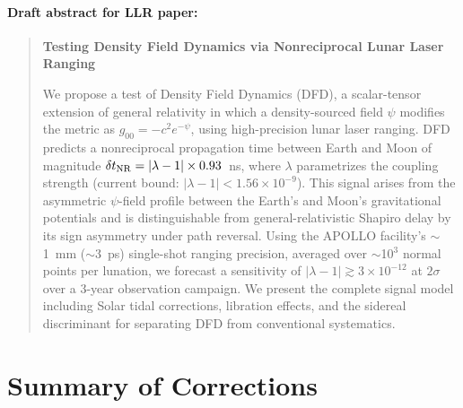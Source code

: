 \documentclass[11pt,a4paper]{article}
\newcounter{findingctr}
\newenvironment{finding}[1][]{%
  \refstepcounter{findingctr}%
  \begin{tcolorbox}[colback=blue!3!white, colframe=blue!50!black,
    title=\textbf{Finding \thefindingctr: #1}]
}{%
  \end{tcolorbox}%
}
\begin{document}
\begin{finding}[\textbf{GPS RETRACTED}: Signal $10^6\times$ Below
  Noise at Current $|\lambda - 1|$ Bound]
\paragraph{Draft abstract for LLR paper:}

\begin{quote}
\textbf{Testing Density Field Dynamics via Nonreciprocal Lunar
Laser Ranging}

We propose a test of Density Field Dynamics (DFD), a
scalar-tensor extension of general relativity in which a density-sourced
field $\psi$ modifies the metric as $g_{00} = -c^2 e^{-\psi}$,
using high-precision lunar laser ranging. DFD predicts a
nonreciprocal propagation time between Earth and Moon of
magnitude $\delta t_{\rm NR} = |\lambda - 1| \times 0.93$~ns,
where $\lambda$ parametrizes the coupling strength
(current bound: $|\lambda - 1| < 1.56 \times 10^{-9}$).
This signal arises from the asymmetric $\psi$-field profile
between the Earth's and Moon's gravitational potentials and
is distinguishable from general-relativistic Shapiro delay
by its sign asymmetry under path reversal. Using the
APOLLO facility's $\sim$1~mm ($\sim$3~ps) single-shot ranging
precision, averaged over $\sim$10$^3$ normal points per lunation,
we forecast a sensitivity of
$|\lambda - 1| \gtrsim 3 \times 10^{-12}$ at $2\sigma$
over a 3-year observation campaign. We present the complete
signal model including Solar tidal corrections, libration
effects, and the sidereal discriminant for separating DFD
from conventional systematics.
\end{quote}

\end{finding}


\section*{Summary of Corrections}
\end{document}
